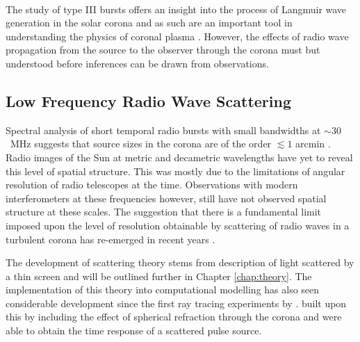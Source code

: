 \paragraph*{} The study of type III bursts offers an insight into the process of Langmuir wave generation in the solar corona and as such are an important tool in understanding the physics of coronal plasma \citep{Reid2014}. However, the effects of radio wave propagation from the source to the observer through the corona must but understood before inferences can be drawn from observations. 

\subsection{Low Frequency Radio Wave Scattering}

Spectral analysis of short temporal radio bursts with small bandwidths at $\sim 30$~MHz suggests that source sizes in the corona are of the order $\lesssim 1$ arcmin \citep{McConnell1980, Kontar2017}. Radio images of the Sun at metric and decametric wavelengths have yet to reveal this level of spatial structure. This was mostly due to the limitations of angular resolution of radio telescopes at the time. 
Observations with modern interferometers at these frequencies however, still have not observed spatial structure at these scales. The suggestion that there is a fundamental limit imposed upon the level of resolution obtainable by scattering of radio waves in a turbulent corona \citep{Bastian1994} has re-emerged in recent years \citep{Thejappa2007,Thejappa2008,Kontar2017,Kontar2019}. 

The development of scattering theory stems from \cite{Chandrasekhar1952} description of light scattered by a thin screen and will be outlined further in Chapter \ref{chap:theory}. The implementation of this theory into computational modelling has also seen considerable development since the first ray tracing experiments by \cite{Fokker1965}. \cite{Steinberg1971} built upon this by including the effect of spherical refraction through the corona and were able to obtain the time response of a scattered pulse source.


